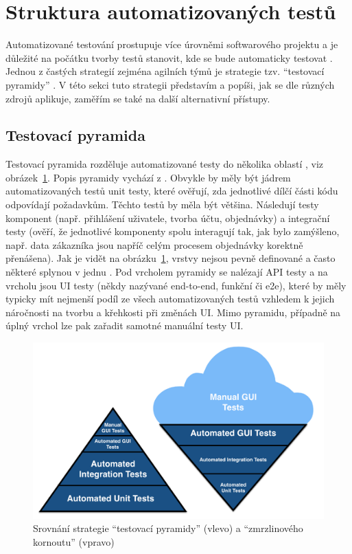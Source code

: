 \section{Struktura automatizovaných testů}

Automatizované testování prostupuje více úrovněmi softwarového projektu \cite{test-kitner2} a je důležité na počátku tvorby testů stanovit, kde se bude automaticky testovat \cite{test-kitner}. Jednou z častých strategií zejména agilních týmů je strategie tzv. \enquote{testovací pyramidy} \cite{test-smartbear}. V této sekci tuto strategii představím a popíši, jak se dle různých zdrojů aplikuje, zaměřím se také na další alternativní přístupy.

\subsection{Testovací pyramida}\label{subsec:testingpyramid}

Testovací pyramida rozděluje automatizované testy do několika oblastí \cite{test-smartbear}, viz obrázek~\ref{fig:testing_pyramid}. Popis pyramidy vychází z \cite{test-kitner2, test-smartbear}. Obvykle by měly být jádrem automatizovaných testů unit testy, které ověřují, zda jednotlivé dílčí části kódu odpovídají požadavkům. Těchto testů by měla být většina. Následují testy komponent (např. přihlášení uživatele, tvorba účtu, objednávky) a integrační testy (ověří, že jednotlivé komponenty spolu interagují tak, jak bylo zamýšleno, např. data zákazníka jsou napříč celým procesem objednávky korektně přenášena). Jak je vidět na obrázku~\ref{fig:testing_pyramid}, vrstvy nejsou pevně definované a často některé splynou v jednu \cite{test-fowler}. Pod vrcholem pyramidy se nalézají API testy a na vrcholu jsou UI testy (někdy nazývané end-to-end, funkční či e2e), které by měly typicky mít nejmenší podíl ze všech automatizovaných testů vzhledem k jejich náročnosti na tvorbu a křehkosti při změnách UI. Mimo pyramidu, případně na úplný vrchol lze pak zařadit samotné manuální testy UI.

\begin{figure}[ht]\centering
	\includegraphics[width=1\textwidth]{img/ext/testing_pyramid.png}
	\caption[Srovnání strategie \enquote{testovací pyramidy} a \enquote{zmrzlinového kornoutu}]{Srovnání strategie \enquote{testovací pyramidy} (vlevo) a \enquote{zmrzlinového kornoutu} (vpravo) \cite{test-fishman}}\label{fig:testing_pyramid}
\end{figure}

